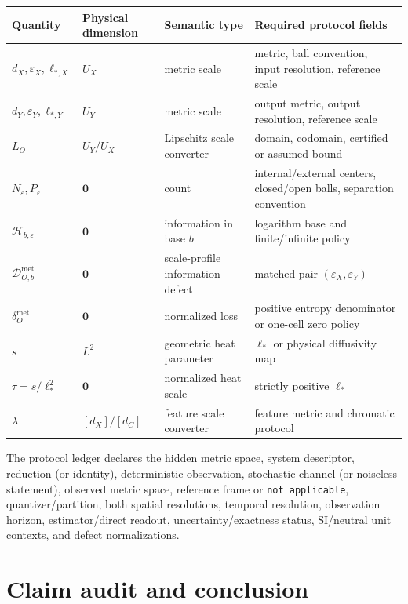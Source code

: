 \documentclass[11pt,a4paper]{article}
\theoremstyle{definition}
\theoremstyle{plain}
\theoremstyle{remark}
\newcommand{\Hmet}{\mathscr{H}}
\newcommand{\Dmet}{\mathscr{D}^{\mathrm{met}}}
\newcommand{\dmet}{\delta^{\mathrm{met}}}
\begin{document}
\begin{center}
\small
\begin{tabularx}{\linewidth}{@{}L{30mm}L{24mm}L{28mm}Y@{}}
\toprule
Quantity & Physical dimension & Semantic type & Required protocol fields\\
\midrule
$d_X,\varepsilon_X,\ell_{*,X}$ & $U_X$ & metric scale
& metric, ball convention, input resolution, reference scale\\
$d_Y,\varepsilon_Y,\ell_{*,Y}$ & $U_Y$ & metric scale
& output metric, output resolution, reference scale\\
$L_O$ & $U_Y/U_X$ & Lipschitz scale converter
& domain, codomain, certified or assumed bound\\
$N_\varepsilon,P_\varepsilon$ & $\mathbf0$ & count
& internal/external centers, closed/open balls, separation convention\\
$\Hmet_{b,\varepsilon}$ & $\mathbf0$ & information in base $b$
& logarithm base and finite/infinite policy\\
$\Dmet_{O,b}$ & $\mathbf0$ & scale-profile information defect
& matched pair $(\varepsilon_X,\varepsilon_Y)$\\
$\dmet_O$ & $\mathbf0$ & normalized loss
& positive entropy denominator or one-cell zero policy\\
$s$ & $L^2$ & geometric heat parameter
& $\ell_*$ or physical diffusivity map\\
$\tau=s/\ell_*^2$ & $\mathbf0$ & normalized heat scale
& strictly positive $\ell_*$\\
$\lambda$ & $[d_X]/[d_C]$ & feature scale converter
& feature metric and chromatic protocol\\
\bottomrule
\end{tabularx}
\end{center}

The protocol ledger declares the hidden metric space, system descriptor,
reduction (or identity), deterministic observation, stochastic channel (or
noiseless statement), observed metric space, reference frame or
\texttt{not applicable}, quantizer/partition, both spatial resolutions,
temporal resolution, observation horizon, estimator/direct readout,
uncertainty/exactness status, SI/neutral unit contexts, and defect
normalizations.

\section{Claim audit and conclusion}
\end{document}
